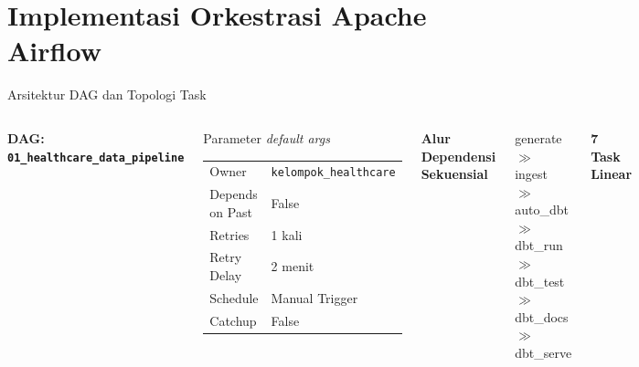 \documentclass[xcolor=table,t,aspectratio=169]{beamer}
\begin{document}
\section{Implementasi Orkestrasi Apache Airflow}

\begin{frame}{Arsitektur DAG dan Topologi Task}
  \footnotesize
  \begin{columns}[T]
    \textbf{DAG: \texttt{01\_healthcare\_data\_pipeline}}
    \vspace{4pt}

    \begin{block}{Parameter \textit{default args}}
      \scriptsize
      \begin{tabular}{@{}ll@{}}
        Owner           & \texttt{kelompok\_healthcare} \\
        Depends on Past & False \\
        Retries         & 1 kali \\
        Retry Delay     & 2 menit \\
        Schedule        & Manual Trigger \\
        Catchup         & False \\
      \end{tabular}
    \end{block}

    \vspace{5pt}
    \textbf{Alur Dependensi Sekuensial}
    \begin{tcolorbox}[
      colback=backcolour, colframe=ugmblue!50,
      top=2pt, bottom=2pt, left=4pt, right=4pt
    ]
      \tiny\ttfamily
      generate $\gg$ ingest $\gg$ auto\_dbt \\
      $\gg$ dbt\_run $\gg$ dbt\_test \\
      $\gg$ dbt\_docs $\gg$ dbt\_serve
    \end{tcolorbox}

    \textbf{7 Task Linear}
    \vspace{2pt}


\end{columns}
\end{frame}
\end{document}
